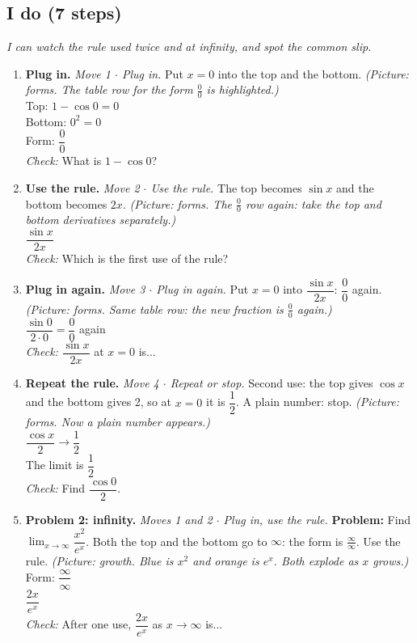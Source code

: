 \documentclass[11pt]{article}
\begin{document}
\subsection*{I do (7 steps)}
\textit{I can watch the rule used twice and at infinity, and spot the common slip.}\par
\begin{enumerate}
\item \textbf{Plug in.} \textit{Move 1 $\cdot$ Plug in.} Put $x=0$ into the top and the bottom. \textit{(Picture: forms. The table row for the form $\frac00$ is highlighted.)}\\ Top: $1-\cos0=0$\\ Bottom: $0^2=0$\\ Form: $\dfrac00$\\ \textit{Check:} What is $1-\cos0$? 
\item \textbf{Use the rule.} \textit{Move 2 $\cdot$ Use the rule.} The top becomes $\sin x$ and the bottom becomes $2x$. \textit{(Picture: forms. The $\frac00$ row again: take the top and bottom derivatives separately.)}\\ $\dfrac{\sin x}{2x}$\\ \textit{Check:} Which is the first use of the rule? 
\item \textbf{Plug in again.} \textit{Move 3 $\cdot$ Plug in again.} Put $x=0$ into $\dfrac{\sin x}{2x}$: $\dfrac00$ again. \textit{(Picture: forms. Same table row: the new fraction is $\frac00$ again.)}\\ $\dfrac{\sin0}{2\cdot0}=\dfrac00$ again\\ \textit{Check:} $\dfrac{\sin x}{2x}$ at $x=0$ is... 
\item \textbf{Repeat the rule.} \textit{Move 4 $\cdot$ Repeat or stop.} Second use: the top gives $\cos x$ and the bottom gives 2, so at $x=0$ it is $\dfrac12$. A plain number: stop. \textit{(Picture: forms. Now a plain number appears.)}\\ $\dfrac{\cos x}{2}\to\dfrac{1}{2}$\\ The limit is $\dfrac12$\\ \textit{Check:} Find $\dfrac{\cos0}{2}$. 
\item \textbf{Problem 2: infinity.} \textit{Moves 1 and 2 $\cdot$ Plug in, use the rule.} \textbf{Problem:} Find $\displaystyle\lim_{x\to\infty}\dfrac{x^2}{e^x}$. Both the top and the bottom go to $\infty$: the form is $\frac{\infty}{\infty}$. Use the rule. \textit{(Picture: growth. Blue is $x^2$ and orange is $e^x$. Both explode as $x$ grows.)}\\ Form: $\dfrac{\infty}{\infty}$\\ $\dfrac{2x}{e^x}$\\ \textit{Check:} After one use, $\dfrac{2x}{e^x}$ as $x\to\infty$ is... 

\end{enumerate}
\end{document}
